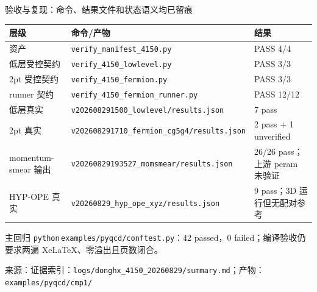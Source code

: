 \documentclass[UTF8,aspectratio=169,11pt]{ctexbeamer}
\newcommand{\source}[1]{\vspace{0.05em}\par{\raggedright\scriptsize\color{muted}来源：#1\par}}
\newcommand{\codepath}[1]{\nolinkurl{#1}}
\begin{document}
\begin{frame}[t]{验收与复现：命令、结果文件和状态语义均已留痕}
  \footnotesize
  \renewcommand{\arraystretch}{1.00}
  \begin{tabularx}{0.96\textwidth}{@{}L Y l@{}}
    \toprule
    层级 & 命令/产物 & 结果\\
    \midrule
    资产 & \codepath{verify_manifest_4150.py} & PASS 4/4\\
    低层受控契约 & \codepath{verify_4150_lowlevel.py} & PASS 3/3\\
    2pt 受控契约 & \codepath{verify_4150_fermion.py} & PASS 3/3\\
    runner 契约 & \codepath{verify_4150_fermion_runner.py} & PASS 12/12\\
    低层真实 & \codepath{v202608291500_lowlevel/results.json} & 7 pass\\
    2pt 真实 & \codepath{v202608291710_fermion_cg5g4/results.json} & 2 pass + 1 unverified\\
    momentum-smear 输出 & \codepath{v20260829193527_momsmear/results.json} & 26/26 pass；上游 peram 未验证\\
    HYP-OPE 真实 & \codepath{v20260829_hyp_ope_xyz/results.json} & 9 pass；3D 运行但无配对参考\\
    \bottomrule
  \end{tabularx}
  \vspace{0.10em}
  \begin{block}{主回归}
    \texttt{python}\,\codepath{examples/pyqcd/conftest.py}：42 passed，0 failed；编译验收仍要求两遍 XeLaTeX、零溢出且页数闭合。
  \end{block}
  \source{证据索引：\codepath{logs/donghx_4150_20260829/summary.md}；产物：\codepath{examples/pyqcd/cmp1/}}
\end{frame}

\appendix
\end{document}
